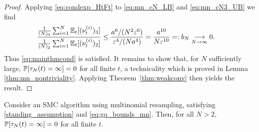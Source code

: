 \begin{proof}
%
Applying \eqref{eq:condexp_HtFt} to \eqref{eq:mn_cN_LB} and \eqref{eq:mn_cN3_UB} we find
\begin{align*}
\frac{\frac{1}{(N)_3} \sum_{i=1}^N \mathbb{E}_t[ (\nu_t^{(i)})_3 ]}{\frac{1}{(N)_2} \sum_{i=1}^N \mathbb{E}_t[ (\nu_t^{(i)})_2 ]}
&\leq \frac{ a^6 / (N^2 \varepsilon^6) }{ \varepsilon^4 / (N a^4) }
= \frac{ a^{10} }{ N\varepsilon^{10} }
=: b_N \underset{N\to\infty}{\longrightarrow} 0.
\end{align*}
Thus \eqref{eq:mainthmcond} is satisfied. 
It remains to show that, for $N$ sufficiently large, $\mathbb{P}[ \tau_N(t) = \infty ] =0$ for all finite $t$, a technicality which is proved in Lemma \ref{thm:mn_nontriviality}. 
Applying Theorem~\ref{thm:weakconv} then yields the result.
\end{proof}



\begin{lemma}\label{thm:mn_nontriviality}
Consider an SMC algorithm using multinomial resampling, satisfying \ref{standing_assumption} and \eqref{eq:gq_bounds_mn}. 
Then, for all $N>2$, $\mathbb{P}[ \tau_N(t) = \infty ]=0$ for all finite $t$.
\end{lemma}

